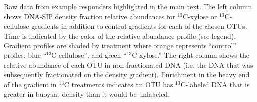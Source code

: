 Raw data from example responders highlighted in the main text. The left column
shows DNA-SIP density fraction relative abundances for $^{13}$C-xylose or
$^{13}$C-cellulose gradients in addition to control gradients for each of the
chosen OTUs. Time is indicated by the color of the relative abundance profile
(see legend). Gradient profiles are shaded by treatment where orange represents
``control'' profles, blue ``$^{13}$C-cellulose'', and green
``$^{13}$C-xylose.'' The right column shows the relative abundance of each OTU
in non-fractionated DNA (i.e. the DNA that was subsequently fractionated on the
density gradient). Enrichment in the heavy end of the gradient in $^{13}$C
treatments indicates an OTU has $^{13}$C-labeled DNA that is greater in buoyant
density than it would be unlabeled.

